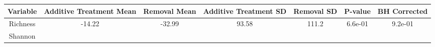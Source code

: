 \documentclass[12pt,]{article}
\begin{document}
\begin{longtable}[]{@{}ccccccc@{}}
\toprule
\begin{minipage}[b]{0.14\columnwidth}\centering\strut
Variable\strut
\end{minipage} & \begin{minipage}[b]{0.16\columnwidth}\centering\strut
Additive Treatment Mean\strut
\end{minipage} & \begin{minipage}[b]{0.10\columnwidth}\centering\strut
Removal Mean\strut
\end{minipage} & \begin{minipage}[b]{0.15\columnwidth}\centering\strut
Additive Treatment SD\strut
\end{minipage} & \begin{minipage}[b]{0.09\columnwidth}\centering\strut
Removal SD\strut
\end{minipage} & \begin{minipage}[b]{0.07\columnwidth}\centering\strut
P-value\strut
\end{minipage} & \begin{minipage}[b]{0.10\columnwidth}\centering\strut
BH Corrected\strut
\end{minipage}\tabularnewline
\midrule
\endhead
\begin{minipage}[t]{0.14\columnwidth}\centering\strut
Richness\strut
\end{minipage} & \begin{minipage}[t]{0.16\columnwidth}\centering\strut
-14.22\strut
\end{minipage} & \begin{minipage}[t]{0.10\columnwidth}\centering\strut
-32.99\strut
\end{minipage} & \begin{minipage}[t]{0.15\columnwidth}\centering\strut
93.58\strut
\end{minipage} & \begin{minipage}[t]{0.09\columnwidth}\centering\strut
111.2\strut
\end{minipage} & \begin{minipage}[t]{0.07\columnwidth}\centering\strut
6.6e-01\strut
\end{minipage} & \begin{minipage}[t]{0.10\columnwidth}\centering\strut
9.2e-01\strut
\end{minipage}\tabularnewline
\begin{minipage}[t]{0.14\columnwidth}\centering\strut
Shannon\strut
\end{minipage} & \begin{minipage}[t]{0.16\columnwidth}\centering\strut

\end{minipage}
\end{longtable}
\end{document}
